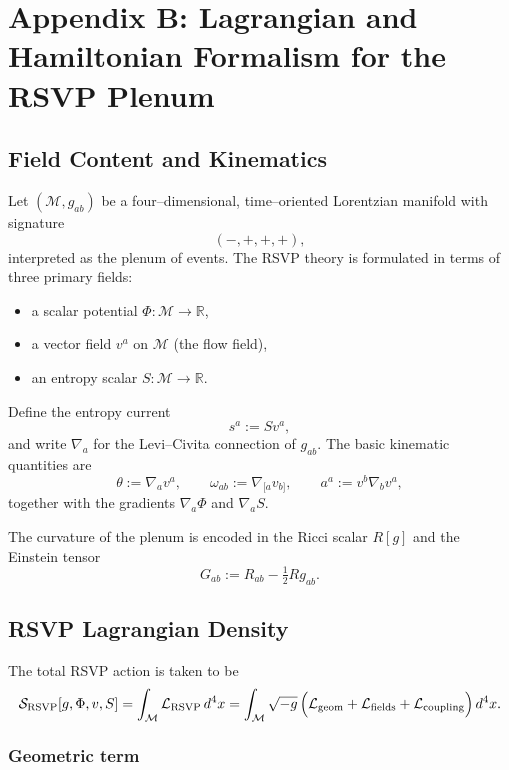 \chapter*{Appendix B: Lagrangian and Hamiltonian Formalism for the RSVP Plenum}

\section{Field Content and Kinematics}

Let $(\mathcal{M},g_{ab})$ be a four–dimensional, time–oriented Lorentzian manifold with signature
\[
(-,+,+,+),
\]
interpreted as the plenum of events. The RSVP theory is formulated in terms of three primary fields:
\begin{itemize}
  \item a scalar potential $\Phi : \mathcal{M}\to\mathbb{R}$,
  \item a vector field $v^a$ on $\mathcal{M}$ (the flow field),
  \item an entropy scalar $S : \mathcal{M}\to\mathbb{R}$.
\end{itemize}

Define the entropy current
\[
s^a := S v^a,
\]
and write $\nabla_a$ for the Levi–Civita connection of $g_{ab}$. The basic kinematic quantities are
\[
\theta := \nabla_a v^a,\qquad
\omega_{ab} := \nabla_{[a} v_{b]},\qquad
a^a := v^b \nabla_b v^a,
\]
together with the gradients $\nabla_a \Phi$ and $\nabla_a S$.

The curvature of the plenum is encoded in the Ricci scalar $R[g]$ and the Einstein tensor
\[
G_{ab} := R_{ab} - \tfrac{1}{2} R g_{ab}.
\]

\section{RSVP Lagrangian Density}

The total RSVP action is taken to be
\begin{equation}
\label{eq:RSVP-action}
\mathcal{S}_{\mathrm{RSVP}}[g,\Phi,v,S]
  = \int_{\mathcal{M}} \mathcal{L}_{\mathrm{RSVP}} \, d^4x
  = \int_{\mathcal{M}} \sqrt{-g}\,\Bigl(
      \mathcal{L}_{\mathrm{geom}}
    + \mathcal{L}_{\mathrm{fields}}
    + \mathcal{L}_{\mathrm{coupling}}
    \Bigr)\, d^4x.
\end{equation}

\subsection{Geometric term}

